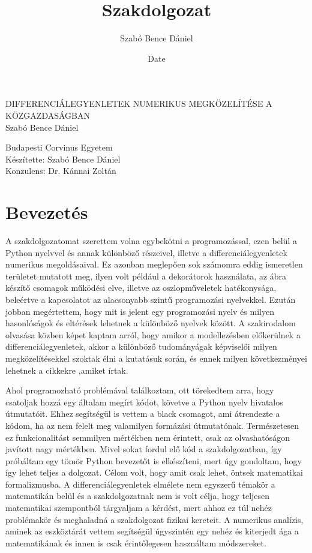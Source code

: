 \documentclass{article}
\title{Szakdolgozat}
\author{Szabó Bence Dániel }
\date{Date}
\theoremstyle{definition}
\theoremstyle{theorem}
\begin{document}
\begin{center}
\fontsize{40pt}{12pt}\selectfont

    DIFFERENCIÁLEGYENLETEK NUMERIKUS MEGKÖZELÍTÉSE A KÖZGAZDASÁGBAN\\
    \bigskip
    Szabó Bence Dániel \\
\end{center}

\pagebreak

\begin{center}
\fontsize{40pt}{12pt}\selectfont
    Budapesti Corvinus Egyetem \\
    \bigskip
    Készítette: Szabó Bence Dániel \\
    \bigskip
    Konzulens: Dr. Kánnai Zoltán\\
\end{center}
\pagebreak
\tableofcontents
\pagebreak
\section{Bevezetés}
A szakdolgozatomat szerettem volna egybekötni a programozással, ezen belül a Python nyelvvel és annak különböző részeivel, illetve a differenciálegyenletek numerikus megoldásaival. Ez azonban meglepően sok számomra eddig ismeretlen területet mutatott meg, ilyen volt például a dekorátorok használata, az ábra készítő csomagok működési elve, illetve az oszlopműveletek hatékonysága, beleértve a kapcsolatot az alacsonyabb szintű programozási nyelvekkel. Ezután jobban megértettem, hogy mit is jelent egy programozási nyelv és milyen hasonlóságok és eltérések lehetnek a különböző nyelvek között. A szakirodalom olvasása közben képet kaptam arról, hogy amikor a modellezésben előkerülnek a differenciálegyenletek, akkor a különböző tudományágak képviselői milyen megközelítésekkel szoktak élni a kutatásuk során, és ennek milyen következményei lehetnek a cikkekre ,amiket írtak.

Ahol programozható problémával találkoztam, ott törekedtem arra, hogy csatoljak hozzá egy általam megírt kódot, követve a Python nyelv hivatalos útmutatóit. Ehhez segítségül is vettem a black csomagot, ami átrendezte a kódom, ha az nem felelt meg valamilyen formázási útmutatónak. Természetesen ez funkcionalitást semmilyen mértékben nem érintett, csak az olvashatóságon javított nagy mértékben. Mivel sokat fordul elő kód a szakdolgozatban, így próbáltam egy tömör Python bevezetőt is elkészíteni, mert úgy gondoltam, hogy így lehet teljes a dolgozat. Célom volt,  hogy amit csak lehet, öntsek matematikai formalizmusba.  A differenciálegyenletek elmélete nem egyszerű témakör a matematikán belül és a szakdolgozatnak nem is volt célja, hogy teljesen matematikai szempontból tárgyaljam a kérdést, mert ahhoz ez túl nehéz problémakör és meghaladná  a szakdolgozat fizikai kereteit. A numerikus analízis, aminek az eszköztárát vettem segítségül úgyszintén egy nehéz és kiterjedt ága a matematikának és innen is csak érintőlegesen használtam módszereket.
\end{document}
